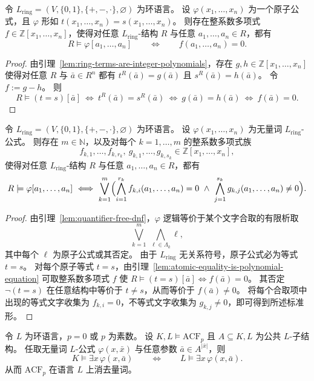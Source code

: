 \documentclass[lang=cn,a4paper,newtx,section]{elegantbook}
\begin{document}
 \begin{lemma}
\label{atomic-equality-is-polynomial-equation}
令 $L_{\mathrm{ring}}=(V,\{0,1\},\{+,-,\cdot\},\varnothing)$ 为环语言。
设 $\varphi(x_1,\dots,x_n)$ 为一个原子公式，且 $\varphi$ 形如 $t(x_1,\dots,x_n)=s(x_1,\dots,x_n)$。
则存在整系数多项式 $f\in\mathbb Z[x_1,\dots,x_n]$，使得对任意 $L_{\mathrm{ring}}$-结构 $R$ 与任意 $a_1,\dots,a_n\in R$，都有
\[
  R\models\varphi[a_1,\dots,a_n]\qquad\Longleftrightarrow\qquad f(a_1,\dots,a_n)=0.
\]
\end{lemma}

\begin{proof}
由引理~\ref{lem:ring-terms-are-integer-polynomials}，存在 $g,h\in\mathbb Z[x_1,\dots,x_n]$ 使得对任意 $R$ 与 $\bar a\in R^n$ 都有
$t^R(\bar a)=g(\bar a)$ 且 $s^R(\bar a)=h(\bar a)$。
令 $f:=g-h$。
则
\[
  R\models(t=s)[\bar a]
  \ \Longleftrightarrow\ 
  t^R(\bar a)=s^R(\bar a)
  \ \Longleftrightarrow\ 
  g(\bar a)=h(\bar a)
  \ \Longleftrightarrow\ 
  f(\bar a)=0.
\]
\end{proof}

\begin{theorem}
\label{qf-ring-formula-polynomial-normal-form}
令 $L_{\mathrm{ring}}=(V,\{0,1\},\{+,-,\cdot\},\varnothing)$ 为环语言。
设 $\varphi(x_1,\dots,x_n)$ 为无量词 $L_{\mathrm{ring}}$-公式。
则存在 $m\in\mathbb N$，以及对每个 $k=1,\dots,m$ 的整系数多项式族
\[
  f_{k,1},\dots,f_{k,r_k},\ g_{k,1},\dots,g_{k,s_k}\in\mathbb Z[x_1,\dots,x_n],
\]
使得对任意 $L_{\mathrm{ring}}$-结构 $R$ 与任意 $a_1,\dots,a_n\in R$，都有
\[
  R\models\varphi[a_1,\dots,a_n]
  \ \Longleftrightarrow\ 
  \bigvee_{k=1}^m\Bigl(\bigwedge_{i=1}^{r_k} f_{k,i}(a_1,\dots,a_n)=0\ \wedge\ \bigwedge_{j=1}^{s_k} g_{k,j}(a_1,\dots,a_n)\neq 0\Bigr).
\]
\end{theorem}

\begin{proof}
由引理~\ref{lem:quantifier-free-dnf}，$\varphi$ 逻辑等价于某个文字合取的有限析取
\[
  \bigvee_{k=1}^m\ \bigwedge_{\ell\in\Lambda_k}\ell,
\]
其中每个 $\ell$ 为原子公式或其否定。
由于 $L_{\mathrm{ring}}$ 无关系符号，原子公式必为等式 $t=s$。
对每个原子等式 $t=s$，由引理~\ref{lem:atomic-equality-is-polynomial-equation} 可取整系数多项式 $f$ 使
$R\models(t=s)[\bar a]\Longleftrightarrow f(\bar a)=0$。
其否定 $\neg(t=s)$ 在任意结构中等价于 $t\neq s$，从而等价于 $f(\bar a)\neq 0$。
将每个合取项中出现的等式文字收集为 $f_{k,i}=0$，不等式文字收集为 $g_{k,j}\neq 0$，即可得到所述标准形。
\end{proof}

 \begin{theorem}[Robinson 判别法证明 $\mathrm{ACF}_p$ 量词消去]
\label{acf-qe-robinson-proof}
令 $L$ 为环语言，$p=0$ 或 $p$ 为素数。
设 $K,L\models\mathrm{ACF}_p$ 且 $A\subseteq K,L$ 为公共 $L$-子结构。
任取无量词 $L$-公式 $\varphi(x,\bar x)$ 与任意参数 $\bar a\in A^{\lvert\bar x\rvert}$，则
\[
  K\models\exists x\,\varphi(x,\bar a)\qquad\Longleftrightarrow\qquad L\models\exists x\,\varphi(x,\bar a).
\]
从而 $\mathrm{ACF}_p$ 在语言 $L$ 上消去量词。
\end{theorem}
\end{document}
